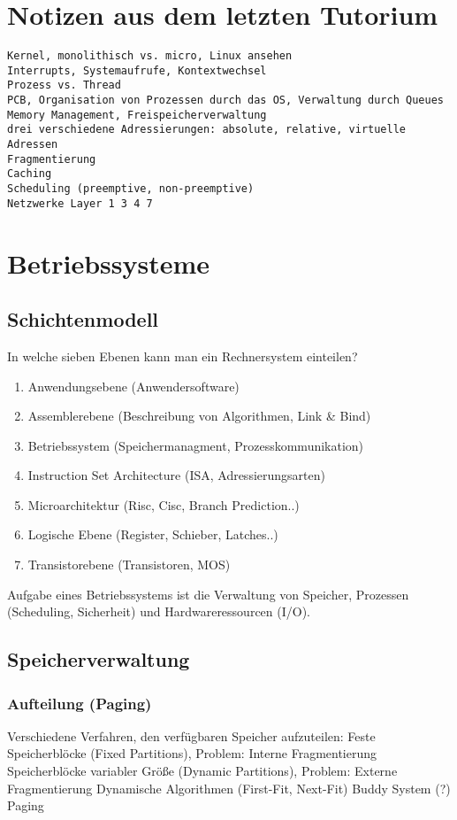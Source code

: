 \section{Notizen aus dem letzten Tutorium}
\begin{verbatim}
Kernel, monolithisch vs. micro, Linux ansehen
Interrupts, Systemaufrufe, Kontextwechsel
Prozess vs. Thread
PCB, Organisation von Prozessen durch das OS, Verwaltung durch Queues
Memory Management, Freispeicherverwaltung
drei verschiedene Adressierungen: absolute, relative, virtuelle Adressen
Fragmentierung
Caching
Scheduling (preemptive, non-preemptive)
Netzwerke Layer 1 3 4 7
\end{verbatim}
%
%
%
\section{Betriebssysteme}

\subsection{Schichtenmodell}

In welche sieben Ebenen kann man ein Rechnersystem einteilen?
\cite{kreissl}
\begin{enumerate}
\item Anwendungsebene (Anwendersoftware)
\item Assemblerebene (Beschreibung von Algorithmen, Link \& Bind)
\item Betriebssystem (Speichermanagment, Prozesskommunikation)
\item Instruction Set Architecture (ISA, Adressierungsarten)
\item Microarchitektur (Risc, Cisc, Branch Prediction..)
\item Logische Ebene (Register, Schieber, Latches..)
\item Transistorebene (Transistoren, MOS)
\end{enumerate}

Aufgabe eines Betriebssystems ist die Verwaltung von
Speicher,
Prozessen (Scheduling, Sicherheit) und
Hardwareressourcen (I/O).

\subsection{Speicherverwaltung}

\subsubsection{Aufteilung (Paging)}
Verschiedene Verfahren, den verfügbaren Speicher aufzuteilen:
Feste Speicherblöcke (Fixed Partitions), Problem: Interne Fragmentierung
Speicherblöcke variabler Größe (Dynamic Partitions), Problem: Externe Fragmentierung
Dynamische Algorithmen (First-Fit, Next-Fit)
Buddy System (?)
Paging

